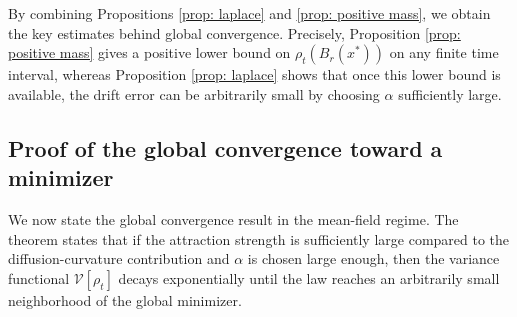 \documentclass[11pt]{amsart}
\begin{document}
By combining Propositions \ref{prop: laplace} and \ref{prop: positive mass}, we obtain the key estimates behind global convergence. Precisely, Proposition \ref{prop: positive mass} gives a positive lower bound on $\rho_t(B_r(x^*))$ on any finite time interval, whereas Proposition \ref{prop: laplace} shows that once this lower bound is available, the drift error can be  arbitrarily small by choosing $\alpha$ sufficiently large. 





\subsection{Proof of the global convergence toward a minimizer}
We now state the global convergence result in the mean-field regime. The theorem states that if the attraction strength is sufficiently large compared to the diffusion-curvature contribution and $\alpha$ is chosen large enough, then the variance functional $\mathcal V[\rho_t]$ decays exponentially until the law reaches an arbitrarily small neighborhood of the global minimizer.  
\end{document}
